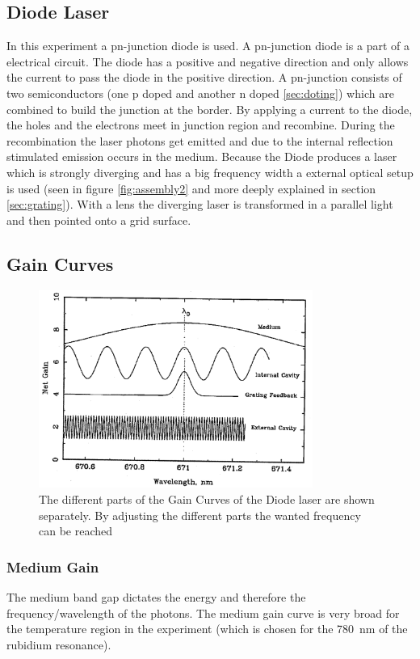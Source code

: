 \subsection{Diode Laser}
In this experiment a pn-junction diode is used.
A pn-junction diode is a part of a electrical circuit.
The diode has a positive and negative direction and only allows the current to pass the diode in the positive direction.
A pn-junction consists of two semiconductors (one p doped and another n doped \ref{sec:doting}) which are combined to build the junction at the border.
By applying a current to the diode, the holes and the electrons meet in junction region and recombine.
During the recombination the laser photons get emitted and due to the internal reflection stimulated emission occurs in the medium.
Because the Diode produces a laser which is strongly diverging and has a big frequency width  a external optical setup is used (seen in figure \ref{fig:assembly2} and more deeply explained in section \ref{sec:grating}).
With a lens the diverging laser is transformed in a parallel light and then pointed onto a grid surface.
\cite{laser_diode}

\subsection{Gain Curves}
\label{sec:gain}
\begin{figure}
    \center
    \includegraphics[width=0.8\textwidth]{bilder/Gain_curve.png}
    \caption{The different parts of the Gain Curves of the Diode laser are shown separately. By adjusting the different parts the wanted frequency can be reached \cite{anleitung}}
    \label{fig:gain}
\end{figure}
\subsubsection{Medium Gain}
The medium band gap dictates the energy and therefore the frequency/wavelength of the photons.
The medium gain curve is very broad for the temperature region in the experiment (which is chosen for the \SI{780}{\nano \metre} of the rubidium resonance).
